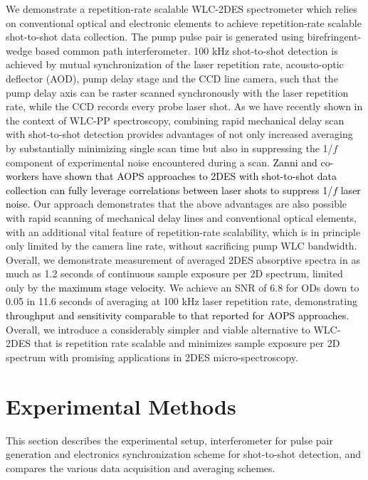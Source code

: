 \documentclass[%
aip,
amsmath,amssymb,
preprint,%
]{revtex4-2}
\newcommand*{\vt}[1]{\textcolor{black}{ #1}}
\begin{document}
We demonstrate a repetition-rate scalable WLC-2DES spectrometer which relies on conventional optical and electronic elements to achieve repetition-rate scalable shot-to-shot data collection. The pump pulse pair is generated using birefringent-wedge based common path interferometer\cite{Cerullo2014}. 100 kHz shot-to-shot detection is achieved by mutual synchronization of the laser repetition rate, acousto-optic deflector (AOD), pump delay stage and the CCD line camera, such that the pump delay axis can be raster scanned synchronously with the laser repetition rate, while the CCD records every probe laser shot. As we have recently shown \cite{Bhat2023} in the context of WLC-PP spectroscopy, combining rapid mechanical delay scan with shot-to-shot detection provides advantages of not only increased averaging by substantially minimizing single scan time but also in suppressing\cite{Moon1993} the 1/$f$ component of experimental noise encountered during a scan. \vt{Zanni and co-workers have shown\cite{Kearns2017} that AOPS approaches to 2DES with shot-to-shot data collection can fully leverage correlations between laser shots to suppress 1/$f$ laser noise.} Our approach demonstrates that the above advantages are also possible with rapid scanning of mechanical delay lines and conventional optical elements, with an additional vital feature of repetition-rate scalability, which is in principle only limited by the camera line rate, without sacrificing pump WLC bandwidth. Overall, we demonstrate measurement of averaged 2DES absorptive spectra in as much as 1.2 seconds of continuous sample exposure per 2D spectrum, limited only by the \vt{maximum stage velocity}. We achieve an SNR of 6.8 for ODs down to 0.05 in 11.6 seconds of averaging at 100 kHz laser repetition rate, demonstrating \vt{throughput and sensitivity comparable to that reported for AOPS approaches}\cite{Kearns2017}. Overall, we introduce a considerably simpler and viable alternative to WLC-2DES that is repetition rate scalable and minimizes sample exposure per 2D spectrum with promising applications in 2DES micro-spectroscopy.



\section{Experimental Methods}

This section describes the experimental setup, interferometer for pulse pair generation and electronics synchronization scheme for shot-to-shot detection, and compares the various data acquisition and averaging schemes.
\end{document}

